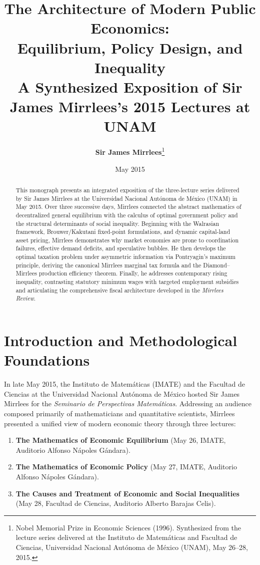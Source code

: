 \documentclass[11pt,a4paper]{article}
\title{\textbf{The Architecture of Modern Public Economics:\\Equilibrium, Policy Design, and Inequality}\\[0.5em]
\large A Synthesized Exposition of Sir James Mirrlees's 2015 Lectures at UNAM}
\author{\textbf{Sir James Mirrlees}\thanks{Nobel Memorial Prize in Economic Sciences (1996). Synthesized from the lecture series delivered at the Instituto de Matemáticas and Facultad de Ciencias, Universidad Nacional Autónoma de México (UNAM), May 26--28, 2015.}}
\date{May 2015}
\begin{document}
\maketitle

\begin{abstract}
This monograph presents an integrated exposition of the three-lecture series delivered by Sir James Mirrlees at the Universidad Nacional Autónoma de México (UNAM) in May 2015. Over three successive days, Mirrlees connected the abstract mathematics of decentralized general equilibrium with the calculus of optimal government policy and the structural determinants of social inequality. Beginning with the Walrasian framework, Brouwer/Kakutani fixed-point formulations, and dynamic capital-land asset pricing, Mirrlees demonstrates why market economies are prone to coordination failures, effective demand deficits, and speculative bubbles. He then develops the optimal taxation problem under asymmetric information via Pontryagin's maximum principle, deriving the canonical Mirrlees marginal tax formula and the Diamond--Mirrlees production efficiency theorem. Finally, he addresses contemporary rising inequality, contrasting statutory minimum wages with targeted employment subsidies and articulating the comprehensive fiscal architecture developed in the \textit{Mirrlees Review}.
\end{abstract}

\tableofcontents
\newpage

\section{Introduction and Methodological Foundations}

In late May 2015, the Instituto de Matemáticas (IMATE) and the Facultad de Ciencias at the Universidad Nacional Autónoma de México hosted Sir James Mirrlees for the \textit{Seminario de Perspectivas Matemáticas}. Addressing an audience composed primarily of mathematicians and quantitative scientists, Mirrlees presented a unified view of modern economic theory through three lectures:
\begin{enumerate}
    \item \textbf{The Mathematics of Economic Equilibrium} (May 26, IMATE, Auditorio Alfonso Nápoles Gándara).
    \item \textbf{The Mathematics of Economic Policy} (May 27, IMATE, Auditorio Alfonso Nápoles Gándara).
    \item \textbf{The Causes and Treatment of Economic and Social Inequalities} (May 28, Facultad de Ciencias, Auditorio Alberto Barajas Celis).
\end{enumerate}
\end{document}
